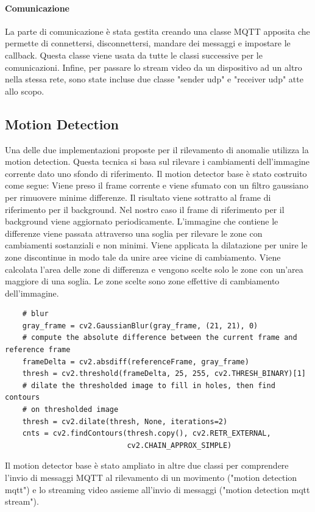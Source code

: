 \paragraph{Comunicazione}
La parte di comunicazione è stata gestita creando una classe MQTT apposita che permette di connettersi, disconnettersi, mandare dei messaggi e impostare le callback. Questa classe viene usata da tutte le classi successive per le comunicazioni.
Infine, per passare lo stream video da un dispositivo ad un altro nella stessa rete, sono state incluse due classe "sender udp" e "receiver udp" atte allo scopo.

\subsection{Motion Detection}
Una delle due implementazioni proposte per il rilevamento di anomalie utilizza la motion detection. Questa tecnica si basa sul rilevare i cambiamenti dell'immagine corrente dato uno sfondo di riferimento.
Il motion detector base è stato costruito come segue:
Viene preso il frame corrente e viene sfumato con un filtro gaussiano per rimuovere minime differenze.
Il risultato viene sottratto al frame di riferimento per il background. 
Nel nostro caso il frame di riferimento per il background viene aggiornato periodicamente. 
L'immagine che contiene le differenze viene passata attraverso una soglia per rilevare le zone con cambiamenti sostanziali e non minimi.
Viene applicata la dilatazione per unire le zone discontinue in modo tale da unire aree vicine di cambiamento. 
Viene calcolata l'area delle zone di differenza e vengono scelte solo le zone con un'area maggiore di una soglia. 
Le zone scelte sono zone effettive di cambiamento dell'immagine. 
    \begin{lstlisting}
    # blur
    gray_frame = cv2.GaussianBlur(gray_frame, (21, 21), 0)
    # compute the absolute difference between the current frame and reference frame
    frameDelta = cv2.absdiff(referenceFrame, gray_frame)
    thresh = cv2.threshold(frameDelta, 25, 255, cv2.THRESH_BINARY)[1]
    # dilate the thresholded image to fill in holes, then find contours
    # on thresholded image
    thresh = cv2.dilate(thresh, None, iterations=2)
    cnts = cv2.findContours(thresh.copy(), cv2.RETR_EXTERNAL,
                            cv2.CHAIN_APPROX_SIMPLE)
    \end{lstlisting}
Il motion detector base è stato ampliato in altre due classi per comprendere l'invio di messaggi MQTT al rilevamento di un movimento ("motion detection mqtt") e lo streaming video assieme all'invio di messaggi ("motion detection mqtt stream"). 

